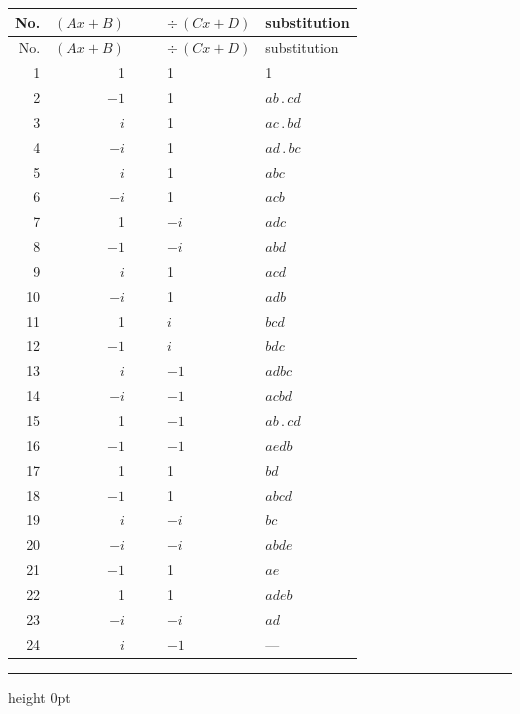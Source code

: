 \documentclass[11pt,a4paper]{article}
\begin{document}
\begin{center}
\footnotesize
\begin{longtable}{r|r|l|l|l|l}
No. & $(A x + B)$ & & & $\div\,(C x + D)$ & substitution\\\hline
\endfirsthead
No. & $(A x + B)$ & & & $\div\,(C x + D)$ & substitution\\\hline
\endhead
1  & 1 & & & 1 & 1\\
2  & $-1$ & & & 1 & $ab\,.\,cd$\\
3  & $i$ & & & 1 & $ac\,.\,bd$\\
4  & $-i$ & & & 1 & $ad\,.\,bc$\\
5  & $i$ & & & 1 & $abc$\\
6  & $-i$ & & & 1 & $acb$\\
7  & 1 & & & $-i$ & $adc$\\
8  & $-1$ & & & $-i$ & $abd$\\
9  & $i$ & & & 1 & $acd$\\
10 & $-i$ & & & 1 & $adb$\\
11 & 1 & & & $i$ & $bcd$\\
12 & $-1$ & & & $i$ & $bdc$\\
13 & $i$ & & & $-1$ & $adbc$\\
14 & $-i$ & & & $-1$ & $acbd$\\
15 & 1 & & & $-1$ & $ab\,.\,cd$\\
16 & $-1$ & & & $-1$ & $aedb$\\
17 & 1 & & & 1 & $bd$\\
18 & $-1$ & & & 1 & $abcd$\\
19 & $i$ & & & $-i$ & $bc$\\
20 & $-i$ & & & $-i$ & $abde$\\
21 & $-1$ & & & 1 & $ae$\\
22 & 1 & & & 1 & $adeb$\\
23 & $-i$ & & & $-i$ & $ad$\\
24 & $i$ & & & $-1$ & ---\\
\end{longtable}
\normalsize
\end{center}

\bigskip
\hrule height 0pt
\bigskip
\end{document}
